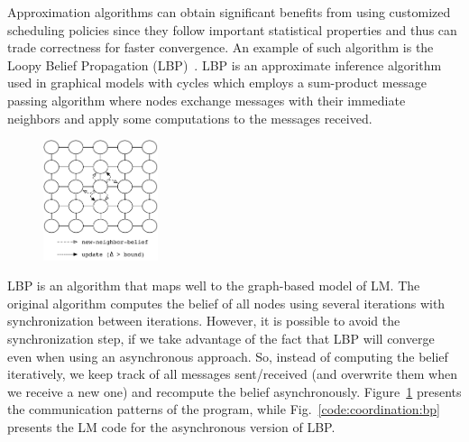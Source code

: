 Approximation algorithms can obtain significant benefits from using customized
scheduling policies since they follow important statistical properties and thus
can trade correctness for faster convergence. An example of such algorithm is
the Loopy Belief Propagation (LBP)~\cite{Murphy99loopybelief}. LBP is an
approximate inference algorithm used in graphical models with cycles which
employs a sum-product message passing algorithm where nodes exchange messages
with their immediate neighbors and apply some computations to the messages
received.

\begin{figure}[h]
   \begin{center}
      \includegraphics[width=0.3\textwidth]{figures/bp/bp.pdf}
   \end{center}


\label{fig:coordination:bp}
\end{figure}

LBP is an algorithm that maps well to the graph-based model of LM. The
original algorithm computes the belief of all nodes using several iterations
with synchronization between iterations. However, it is possible to avoid the
synchronization step, if we take advantage of the fact that LBP will converge
even when using an asynchronous approach. So, instead of computing the belief
iteratively, we keep track of all messages sent/received (and overwrite them
when we receive a new one) and recompute the belief asynchronously.
Figure~\ref{fig:coordination:bp} presents the communication patterns of the
program, while Fig.~\ref{code:coordination:bp} presents the LM code for the
asynchronous version of LBP.

